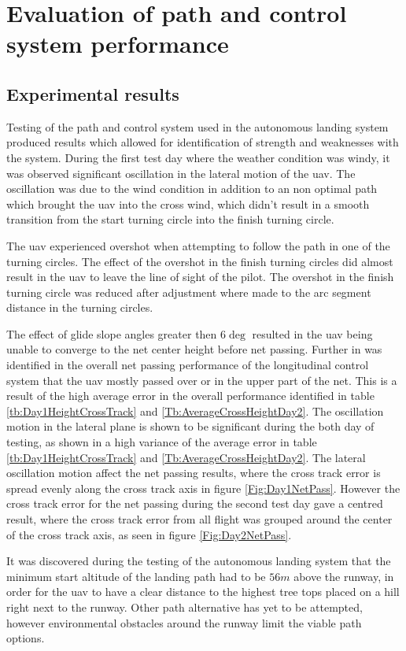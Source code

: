 \section{Evaluation of path and control system performance}
\subsection{Experimental results}
Testing of the path and control system used in the autonomous landing system produced results which allowed for identification of strength and weaknesses with the system. During the first test day where the weather condition was windy, it was observed significant oscillation in the lateral motion of the \gls{uav}. The oscillation was due to the wind condition in addition to an non optimal path which brought the \gls{uav} into the cross wind, which didn't result in a smooth transition from the start turning circle into the finish turning circle.

The \gls{uav} experienced overshot when attempting to follow the path in one of the turning circles. The effect of the overshot in the finish turning circles did almost result in the \gls{uav} to leave the line of sight of the pilot. The overshot in the finish turning circle was reduced after adjustment where made to the arc segment distance in the turning circles.

The effect of glide slope angles greater then $6 \deg$ resulted in the \gls{uav} being unable to converge to the net center height before net passing. Further in was identified in the overall net passing performance of the longitudinal control system that the \gls{uav} mostly passed over or in the upper part of the net. This is a result of the high average error in the overall performance identified in table \ref{tb:Day1HeightCrossTrack} and \ref{Tb:AverageCrossHeightDay2}. The oscillation motion in the lateral plane is shown to be significant during the both day of testing, as shown in a high variance of the average error in table \ref{tb:Day1HeightCrossTrack} and \ref{Tb:AverageCrossHeightDay2}. The lateral oscillation motion affect the net passing results, where the cross track error is spread evenly along the cross track axis in figure \ref{Fig:Day1NetPass}. However the cross track error for the net passing during the second test day gave a centred result, where the cross track error from all flight was grouped around the center of the cross track axis, as seen in figure \ref{Fig:Day2NetPass}.

It was discovered during the testing of the autonomous landing system that the minimum start altitude of the landing path had to be $56 m$ above the runway, in order for the \gls{uav} to have a clear distance to the highest tree tops placed on a hill right next to the runway. Other path alternative has yet to be attempted, however environmental obstacles around the runway limit the viable path options.

